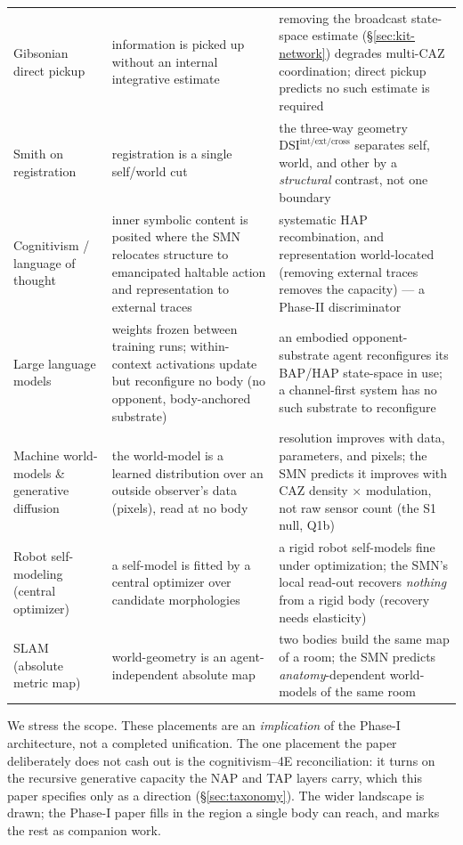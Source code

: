 \documentclass{article}
\begin{document}
\begin{table}[!htbp]
\begin{tabularx}{\linewidth}{@{}p{2.5cm} X X@{}}
\addlinespace[2pt]
Gibsonian direct pickup &
information is picked up without an internal integrative estimate &
removing the broadcast state-space estimate (\S\ref{sec:kit-network})
degrades multi-CAZ coordination; direct pickup predicts no such estimate
is required \\
\addlinespace[2pt]
Smith on registration &
registration is a single self/world cut &
the three-way geometry $\mathrm{DSI}^{\mathrm{int/ext/cross}}$ separates
self, world, and other by a \emph{structural} contrast, not one boundary \\
\addlinespace[2pt]
Cognitivism / language of thought &
inner symbolic content is posited where the SMN relocates structure to
emancipated haltable action and representation to external traces &
systematic HAP recombination, and representation world-located (removing
external traces removes the capacity) --- a Phase-II discriminator \\
\addlinespace[2pt]
Large language models &
weights frozen between training runs; within-context activations update but
reconfigure no body (no opponent, body-anchored substrate) &
an embodied opponent-substrate agent reconfigures its BAP/HAP state-space in use;
a channel-first system has no such substrate to reconfigure \\
\addlinespace[2pt]
Machine world-models \& generative diffusion &
the world-model is a learned distribution over an outside observer's data
(pixels), read at no body &
resolution improves with data, parameters, and pixels; the SMN predicts it
improves with CAZ density $\times$ modulation, not raw sensor count (the
S1 null, Q1b) \\
\addlinespace[2pt]
Robot self-modeling (central optimizer) &
a self-model is fitted by a central optimizer over candidate morphologies &
a rigid robot self-models fine under optimization; the SMN's local read-out
recovers \emph{nothing} from a rigid body (recovery needs elasticity) \\
\addlinespace[2pt]
SLAM (absolute metric map) &
world-geometry is an agent-independent absolute map &
two bodies build the same map of a room; the SMN predicts
\emph{anatomy}-dependent world-models of the same room \\
\bottomrule
\end{tabularx}
\end{table}

We stress the scope.  These placements are an \emph{implication} of the
Phase-I architecture, not a completed unification.  The one placement the
paper deliberately does not cash out is the cognitivism--4E
reconciliation: it turns on the recursive generative capacity the NAP and
TAP layers carry, which this paper specifies only as a direction
(\S\ref{sec:taxonomy}).  The wider landscape is drawn; the Phase-I paper
fills in the region a single body can reach, and marks the rest as
companion work.
\end{document}
